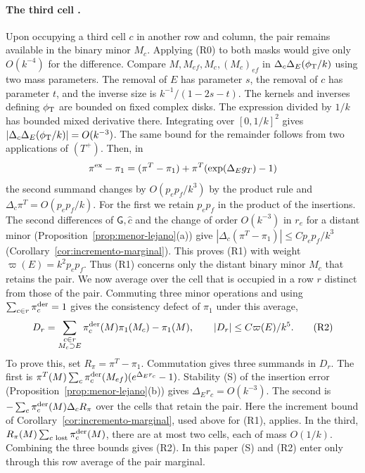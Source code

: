 \paragraph{The third cell .}
Upon occupying a third cell $c$ in another row and column, the pair remains available in the
binary minor $M_c$. Applying (R0) to both masks would give only $O(k^{-4})$ for the difference.
Compare $M,M_{ef},M_c,(M_c)_{ef}$ in $\Delta_c\Delta_E(\phi_{\mathrm T}/k)$ using two mass parameters. The
removal of $E$ has parameter $s$, the removal of $c$ has parameter $t$, and the inverse size is
$k^{-1}/(1-2s-t)$. The kernels and inverses defining $\phi_{\mathrm T}$ are bounded on fixed complex disks.
The expression divided by $1/k$ has bounded mixed derivative there. Integrating over $[0,1/k]^2$
gives $|\Delta_c\Delta_E(\phi_{\mathrm T}/k)|=O(k^{-3})$. The same bound for the remainder follows from two
applications of $(T^+)$. Then, in
\[
 \pi^{\rm ex}-\pi_1=(\pi^T-\pi_1)+\pi^T(\exp(\Delta_E g_T)-1)
\]
the second summand changes by $O(p_ep_f/k^3)$ by the product rule and $\Delta_c\pi^T=O(p_ep_f/k)$.
For the first we retain $p_ep_f$ in the product of the insertions. The second differences of $\mathsf
G,\hat c$ and the change of order $O(k^{-3})$ in $r_e$ for a
distant minor (Proposition~\ref{prop:menor-lejano}(a)) give $|\Delta_c(\pi^T-\pi_1)|\le Cp_ep_f/k^3$
(Corollary~\ref{cor:incremento-marginal}). This proves (R1) with weight $\varpi(E)=k^2p_ep_f$. Thus
(R1) concerns only the distant binary minor $M_c$ that retains the pair. We
now average over the cell that is occupied in a row $r$ distinct from those of the pair. Commuting
three minor operations and using $\sum_{c\in r}\pi^{\rm der}_c=1$ gives the consistency defect of
$\pi_1$ under this average,
\[
  D_r=\sum_{\substack{c\in r\\ M_c\supset E}}\pi^{\rm der}_c(M)\pi_1(M_c)-\pi_1(M),
       \qquad |D_r|\le C\varpi(E)/k^5. \tag{R2}
\]
To prove this, set $R_\pi=\pi^T-\pi_1$. Commutation gives three summands in $D_r$. The first is
$\pi^T(M)\sum_c\pi_c^{\rm der}(M_{ef})(e^{\Delta_E r_c}-1)$. Stability (S) of the insertion error
(Proposition~\ref{prop:menor-lejano}(b)) gives $\Delta_E r_c=O(k^{-3})$. The second is $-\sum_c\pi_c^{\rm
der}(M)\Delta_cR_\pi$ over the cells that retain the pair. Here the increment bound of
Corollary~\ref{cor:incremento-marginal}, used above for (R1), applies. In the third,
$R_\pi(M)\sum_{c\text{ lost}}\pi_c^{\rm der}(M)$, there are at most two cells, each of mass
$O(1/k)$. Combining the three bounds gives (R2). In this paper (S) and (R2) enter only
through this row average of the pair marginal.

